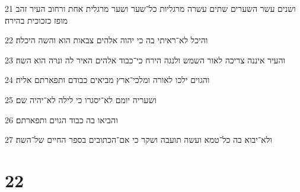 \par 21 ושנים עשר השערים שתים עשרה מרגליות כל־שער ושער מרגלית אחת ורחוב העיר זהב מופז כזכוכית בהירה׃
\par 22 והיכל לא־ראיתי בה כי יהוה אלהים צבאות הוא והשה היכלה׃
\par 23 והעיר איננה צריכה לאור השמש ולנגה הירח כי־כבוד אלהים האיר לה ונרה הוא השה׃
\par 24 והגוים ילכו לאורה ומלכי־ארץ מביאים כבודם ותפארתם אליה׃
\par 25 ושעריה יומם לא־יסגרו כי לילה לא־יהיה שם׃
\par 26 והביאו בה כבוד הגוים ותפארתם׃
\par 27 ולא־יבוא בה כל־טמא ועשה תועבה ושקר כי אם־הכתובים בספר החיים של־השה׃

\chapter{22}

